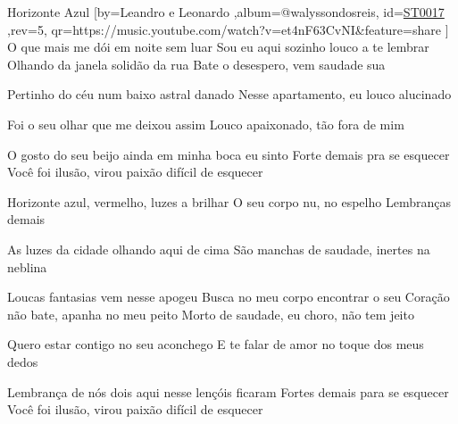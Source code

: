 \beginsong
{Horizonte Azul %
}[by={Leandro e Leonardo %
},album={@walyssondosreis},
id={\href{https://music.youtube.com/watch?v=et4nF63CvNI&feature=share %
}{ST0017 %
}},rev={5}, %
qr={https://music.youtube.com/watch?v=et4nF63CvNI&feature=share %
}]
\beginverse
O que mais me dói em noite sem luar
Sou eu aqui sozinho louco a te lembrar
Olhando da janela solidão da rua
Bate o desespero, vem saudade sua
\endverse

\beginverse
Pertinho do céu num baixo astral danado
Nesse apartamento, eu louco alucinado
\endverse

\beginverse
Foi o seu olhar que me deixou assim
Louco apaixonado, tão fora de mim
\endverse

\beginverse
O gosto do seu beijo ainda em minha boca eu sinto
Forte demais pra se esquecer
Você foi ilusão, virou paixão difícil de esquecer
\endverse

\beginchorus
Horizonte azul, vermelho, luzes a brilhar
O seu corpo nu, no espelho
Lembranças demais
\endchorus


\beginverse
As luzes da cidade olhando aqui de cima
São manchas de saudade, inertes na neblina
\endverse

\beginverse
Loucas fantasias vem nesse apogeu
Busca no meu corpo encontrar o seu
Coração não bate, apanha no meu peito
Morto de saudade, eu choro, não tem jeito
\endverse

\beginverse
Quero estar contigo no seu aconchego
E te falar de amor no toque dos meus dedos
\endverse

\beginverse
Lembrança de nós dois aqui nesse lençóis ficaram
Fortes demais para se esquecer
Você foi ilusão, virou paixão difícil de esquecer
\endverse


